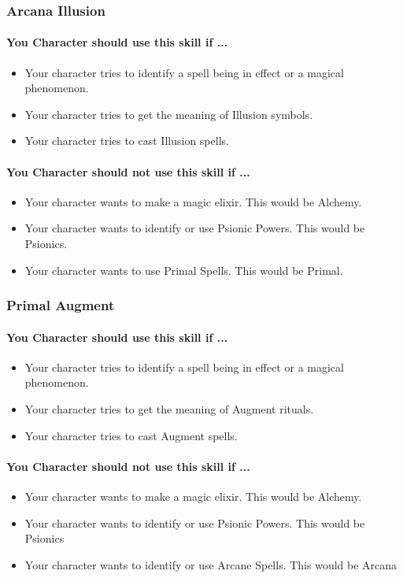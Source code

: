 \begin{multicols}{2}
\subsubsection{Arcana Illusion}\label{skill:arcana_illusion}
\paragraph{You Character should use this skill if ...}
\begin{itemize}
    \item Your character tries to identify a spell being in effect or a magical
        phenomenon.
    \item Your character tries to get the meaning of Illusion symbols.
    \item Your character tries to cast Illusion spells.
\end{itemize}
\paragraph{You Character should not use this skill if ...}
\begin{itemize}
    \item Your character wants to make a magic elixir.  This would be Alchemy.
    \item Your character wants to identify or use Psionic Powers. This would be
        Psionics.
    \item Your character wants to use Primal Spells. This would be Primal.
\end{itemize}

\subsubsection{Primal Augment}\label{skill:primal_augment}
\paragraph{You Character should use this skill if ...}
\begin{itemize}
    \item Your character tries to identify a spell being in effect or a magical
        phenomenon.
    \item Your character tries to get the meaning of Augment rituals.
    \item Your character tries to cast Augment spells.
\end{itemize}
\paragraph{You Character should not use this skill if ...}
\begin{itemize}
    \item Your character wants to make a magic elixir.  This would be Alchemy.
    \item Your character wants to identify or use Psionic Powers. This would be
        Psionics
    \item Your character wants to identify or use Arcane Spells. This would be
        Arcana
\end{itemize}


\end{multicols}
